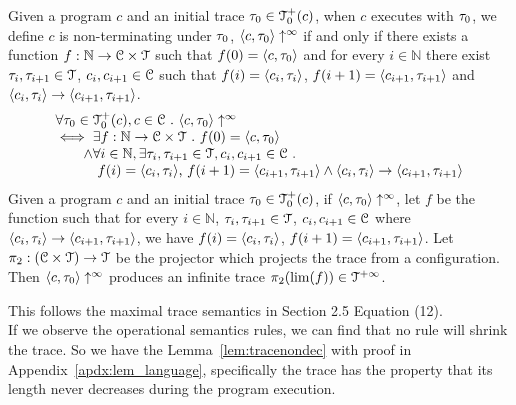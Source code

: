 \begin{defn}
  \label{def:non-terminating-2}
  Given a program $c$ and an initial trace $\mathtt{\tau}_0 \in \mathcal{T}^{+}_0(c)$,
  when $c$ executes with $\mathtt{\tau}_0$,  we define $c$ is non-terminating under $\mathtt{\tau}_0$, $\langle c, \mathtt{\tau}_0 \rangle \uparrow^{\infty}$ if and only if there exists a function
  $f : \mathbb{N} \to \mathcal{C} \times \mathcal{T}$ such that $f(0) = \langle c, \mathtt{\tau}_0 \rangle$ and
  for every $i \in \mathbb{N}$ there exist  $\mathtt{\tau}_i, \mathtt{\tau}_{i + 1}\in \mathcal{T}$, $c_i, c_{i + 1} \in \mathcal{C}$ such that  $f(i) = \langle c_i, \mathtt{\tau}_i \rangle$, $f(i + 1) =  \langle c_{i + 1}, \mathtt{\tau}_{i + 1} \rangle$ and
  $\langle c_i, \mathtt{\tau}_i \rangle \to \langle c_{i + 1}, \mathtt{\tau}_{i + 1} \rangle$. 
  \[
    \begin{array}{l}
    \forall \trace_0 \in \ftdom_0(c), c \in \cdom \st
    \config{c, \trace_0} \uparrow^{\infty}
    \\
    \iff \exists f : \mathbb{N} \to \cdom \times \tdom \st 
    f(0) = \config{c, \trace_0}
    \\ \qquad \land
    \forall i \in \mathbb{N}, \exists \trace_i, \trace_{i + 1} \in \tdom, c_i, c_{i + 1} \in \cdom\st 
    \\ \qquad \quad
    f(i) = \config{c_i, \trace_i}$, $f(i + 1) =  \config{c_{i + 1}, \trace_{i + 1}} \land \config{c_i, \trace_i} \to \config{c_{i + 1}, \trace_{i + 1}}
    \end{array}
  \]
  Given a program $c$ and an initial trace $\mathtt{\tau}_0 \in \mathcal{T}^{+}_0(c)$, if $\langle c, \mathtt{\tau}_0 \rangle \uparrow^{\infty}$, let $f$ be the function such that for every $i \in \mathbb{N}$,  $\mathtt{\tau}_i, \mathtt{\tau}_{i + 1}\in \mathcal{T}$, $c_i, c_{i + 1} \in \mathcal{C}$ where $\langle c_i, \mathtt{\tau}_i \rangle \to \langle c_{i + 1}, \mathtt{\tau}_{i + 1} \rangle$, we have $f(i) = \langle c_i, \mathtt{\tau}_i \rangle$, $f(i + 1) =  \langle c_{i + 1}, \mathtt{\tau}_{i + 1} \rangle$. 
  Let $\pi_2 : (\mathcal{C} \times \mathcal{T}) \to \mathcal{T}$ be the projector which projects the trace from a configuration.
  Then $\langle c, \mathtt{\tau}_0 \rangle \uparrow^{\infty}$ produces an infinite trace $\pi_2(\lim(f)) \in \mathcal{T}^{+\infty}$.
\end{defn}
%
This follows the maximal trace semantics in \cite{cousot2019abstract} Section 2.5 Equation (12).
\\
If we observe the operational semantics rules, we can find that no rule will shrink the trace. 
So we have the Lemma~\ref{lem:tracenondec} with proof in Appendix~\ref{apdx:lem_language}, 
specifically the trace has the property that its length never decreases during the program execution.
